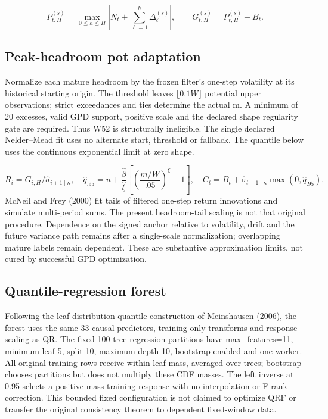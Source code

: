 \documentclass[11pt,a4paper]{article}
\begin{document}
\[
P_{t,H}^{(s)}=\max_{0\le h\le H}\left|N_t+\sum_{\ell=1}^{h}\Delta_{\ell}^{(s)}\right|,\qquad G_{t,H}^{(s)}=P_{t,H}^{(s)}-B_t.
\]
\subsection*{Peak-headroom pot adaptation}
Normalize each mature headroom by the frozen filter's one-step volatility at its historical starting origin. The threshold leaves \(\lfloor0.1W\rfloor\) potential upper observations; strict exceedances and ties determine the actual m. A minimum of 20 excesses, valid GPD support, positive scale and the declared shape regularity gate are required. Thus W52 is structurally ineligible. The single declared Nelder--Mead fit uses no alternate start, threshold or fallback. The quantile below uses the continuous exponential limit at zero shape.

\[
R_i=G_{i,H}/\hat\sigma_{i+1\mid\kappa},\quad\hat q_{.95}=u+\frac{\hat\beta}{\hat\xi}\left[\left(\frac{m/W}{.05}\right)^{\hat\xi}-1\right],\quad C_t=B_t+\hat\sigma_{t+1\mid\kappa}\max(0,\hat q_{.95}).
\]
McNeil and Frey (2000) fit tails of filtered one-step return innovations and simulate multi-period sums. The present headroom-tail scaling is not that original procedure. Dependence on the signed anchor relative to volatility, drift and the future variance path remains after a single-scale normalization; overlapping mature labels remain dependent. These are substantive approximation limits, not cured by successful GPD optimization.

\subsection*{Quantile-regression forest}
Following the leaf-distribution quantile construction of Meinshausen (2006), the forest uses the same 33 causal predictors, training-only transforms and response scaling as QR. The fixed 100-tree regression partitions have max\_features=11, minimum leaf 5, split 10, maximum depth 10, bootstrap enabled and one worker. All original training rows receive within-leaf mass, averaged over trees; bootstrap chooses partitions but does not multiply these CDF masses. The left inverse at 0.95 selects a positive-mass training response with no interpolation or F rank correction. This bounded fixed configuration is not claimed to optimize QRF or transfer the original consistency theorem to dependent fixed-window data.
\end{document}
